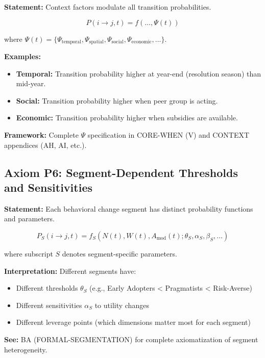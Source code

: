 \documentclass[11pt, a4paper]{article}
\begin{document}
\textbf{Statement:} Context factors modulate all transition probabilities.

\begin{equation}
P(i \to j, t) = f(\ldots, \Psi(t))
\end{equation}

where $\Psi(t) = \{\Psi_{\text{temporal}}, \Psi_{\text{spatial}}, \Psi_{\text{social}}, \Psi_{\text{economic}}, \ldots\}$.

\textbf{Examples:}
\begin{itemize}[nosep]
    \item \textbf{Temporal:} Transition probability higher at year-end (resolution season) than mid-year.
    \item \textbf{Social:} Transition probability higher when peer group is acting.
    \item \textbf{Economic:} Transition probability higher when subsidies are available.
\end{itemize}

\textbf{Framework:} Complete $\Psi$ specification in CORE-WHEN (V) and CONTEXT appendices (AH, AI, etc.).

\subsection{Axiom P6: Segment-Dependent Thresholds and Sensitivities}

\textbf{Statement:} Each behavioral change segment has distinct probability functions and parameters.

\begin{equation}
P_S(i \to j, t) = f_S(N(t), W(t), A_{\text{mod}}(t); \theta_S, \alpha_S, \beta_S, \ldots)
\end{equation}

where subscript $S$ denotes segment-specific parameters.

\textbf{Interpretation:} Different segments have:
\begin{itemize}[nosep]
    \item Different thresholds $\theta_S$ (e.g., Early Adopters < Pragmatists < Risk-Averse)
    \item Different sensitivities $\alpha_S$ to utility changes
    \item Different leverage points (which dimensions matter most for each segment)
\end{itemize}

\textbf{See:} BA (FORMAL-SEGMENTATION) for complete axiomatization of segment heterogeneity.
\end{document}
